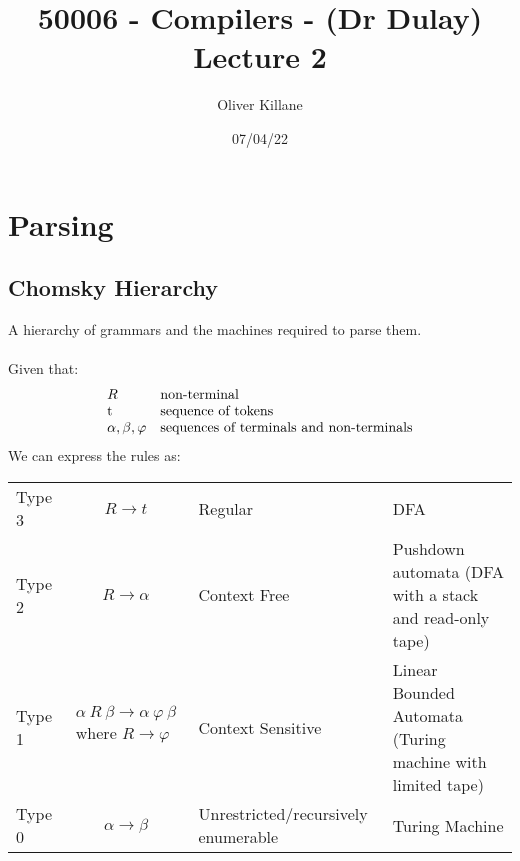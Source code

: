 \documentclass{report}
\title{50006 - Compilers - (Dr Dulay) Lecture 2}
\author{Oliver Killane}
\date{07/04/22}
\begin{document}
\maketitle
{}

\section*{Parsing}

\subsection*{Chomsky Hierarchy}
A hierarchy of grammars and the machines required to parse them.
\\
\\ Given that:
\[\begin{matrix*}[l]
		R & \text{non-terminal} \\
		$t$ & \text{sequence of tokens} \\
		\alpha, \beta, \varphi & \text{sequences of terminals and non-terminals}
	\end{matrix*}\]
We can express the rules as:
\\\begin{tabular}{l c l p{}}                                                                                                                \\
	Type 3 & $R \to t$                   & Regular                             & DFA                                                        \\
	Type 2 & $R \to \alpha$              & Context Free                        & Pushdown automata (DFA with a stack and read-only tape)    \\
	Type 1 & $\begin{matrix}
			\alpha \ R \ \beta \to \alpha \ \varphi \ \beta \\ \text{where } R \to \varphi \\
		\end{matrix}$ & Context Sensitive                   & Linear Bounded Automata (Turing machine with limited tape) \\
	Type 0 & $\alpha \to \beta$          & Unrestricted/recursively enumerable & Turing Machine                                             \\
\end{tabular}
\end{document}
